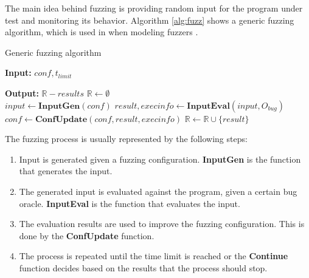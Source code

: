 The main idea behind fuzzing is providing random input for the program under test and monitoring its behavior.
Algorithm \ref{alg:fuzz} shows a generic fuzzing algorithm, which is used in when modeling fuzzers \cite{manes_art_2019}.
\begin{algorithm}[htbp]
    \caption{Generic fuzzing algorithm}\label{alg:fuzz}
    \begin{algorithmic}
        \item \textbf{Input: } $conf, t_{limit}$
        \item \textbf{Output: } $\mathbb{R} - results$
        \State $\mathbb{R} \gets \emptyset$
        \\
        \State $input \gets \textbf{InputGen}(conf)$
        \State $result, execinfo \gets \textbf{InputEval}(input, O_{bug})$
        \State $conf \gets \textbf{ConfUpdate}(conf, result, execinfo)$
        \State $\mathbb{R} \gets \mathbb{R} \cup \{result\}$
        \EndWhile
    \end{algorithmic}
\end{algorithm}
\clearpage

The fuzzing process is usually represented by the following steps:
\begin{enumerate}
    \item Input is generated given a fuzzing configuration.
          \textbf{InputGen} is the function that generates the input.
    \item The generated input is evaluated against the program, given a certain bug oracle.
          \textbf{InputEval} is the function that evaluates the input.
    \item The evaluation results are used to improve the fuzzing configuration.
          This is done by the \textbf{ConfUpdate} function.
    \item The process is repeated until the time limit is reached or the \textbf{Continue} function decides based on the results that the process should stop.
\end{enumerate}


